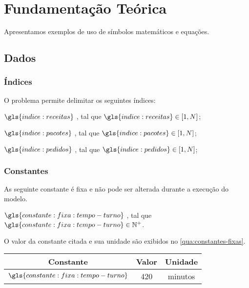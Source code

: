 \section{Fundamentação Teórica}%
\label{sec:fundamentacao}

Apresentamos exemplos de uso de símbolos matemáticos e equações.

\subsection{Dados}

\subsubsection{Índices}

O problema permite delimitar os seguintes índices:

\begin{symbols}
    \item[\( \gls{indice:receitas} \)]
    ,
    tal que \(  \gls{indice:receitas} \in [1, N] \);

    \item[\( \gls{indice:pacotes} \)]
    ,
    tal que \(  \gls{indice:pacotes} \in [1, N] \);

    \item[\( \gls{indice:pedidos} \)]
    ,
    tal que \(  \gls{indice:pedidos} \in [1, N] \);
\end{symbols}

\subsubsection{Constantes}


As seguinte constante é fixa e não pode ser alterada durante a execução do modelo.

\begin{symbols}
    \item[\( \gls{constante:fixa:tempo-turno} \) ]
    ,
    tal que \( \gls{constante:fixa:tempo-turno} \in \mathbb{N}^{+} \).
\end{symbols}

O valor da constante citada e sua unidade são exibidos no \autoref{qua:constantes-fixas}.

\begin{quadro}
    \caption{%
        \label{qua:constantes-fixas}%
        Constantes do problema.
    }

    \begin{tabular}{|c|c|c|}
        \hline
        Constante                              &
        Valor                                  &
        Unidade
        \\
        \hline
        \( \gls{constante:fixa:tempo-turno} \) &
        420                                    &
        minutos
        \\
        \hline
    \end{tabular}

    \ComponenteFontePropria{}
\end{quadro}

